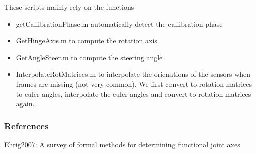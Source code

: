 \documentclass[
]{article}
\begin{document}
These scripts mainly rely on the functions

\begin{itemize}
\item
  getCallibrationPhase.m automatically detect the callibration phase
\item
  GetHingeAxis.m to compute the rotation axis
\item
  GetAngleSteer.m to compute the steering angle
\item
  InterpolateRotMatrices.m to interpolate the orienations of the sensors
  when frames are missing (not very common). We first convert to
  rotation matrices to euler angles, interpolate the euler angles and
  convert to rotation matrices again.
\end{itemize}

\hypertarget{header-n43}{%
\subsubsection{References}\label{header-n43}}

Ehrig2007: A survey of formal methods for determining functional joint
axes
\end{document}
